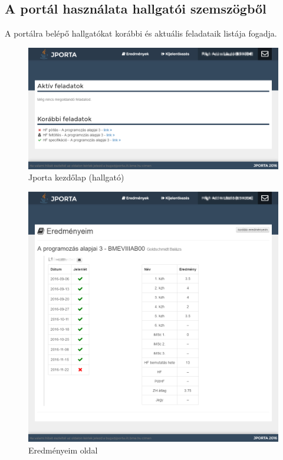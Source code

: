 \subsection{A portál használata hallgatói szemszögből}
A portálra belépő hallgatókat korábbi és aktuális feladataik listája fogadja.
\begin{figure}[h]
    \centering
    \includegraphics[width=\textwidth]{figures/Jporta-home-h}
    \caption{Jporta kezdőlap (hallgató)}
    \label{figure:jporta-home-h}
\end{figure}
\begin{figure}[h]
    \centering
    \includegraphics[width=\textwidth]{figures/Jporta-results}
    \caption{Eredményeim oldal}
    \label{figure:jporta-results}
\end{figure}

